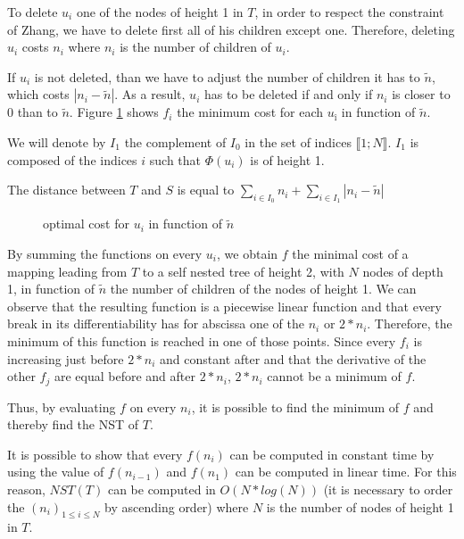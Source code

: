 To delete $u_{i}$ one of the nodes of height 1 in $T$, in order to
respect the constraint of Zhang, we have to delete first all of his
children except one. Therefore, deleting $u_{i}$ costs $n_{i}$ where
$n_{i}$ is the number of children of $u_{i}$.

If $u_{i}$ is not deleted, than we have to adjust the number of
children it has to $\tilde{n}$, which costs
$\left|n_{i} - \tilde{n}\right|$. As a result, $u_{i}$ has to be
deleted if and only if $n_{i}$ is closer to 0 than to
$\tilde{n}$. Figure \ref{fig:optimalcost} shows $f_{i}$ the minimum
cost for each $u_{î}$ in function of $\tilde{n}$.

We will denote by $I_{1}$ the complement of $I_{0}$ in the set of
indices $\llbracket 1;N \rrbracket$. $I_{1}$ is composed of the
indices $i$ such that $\Phi(u_{i})$ is of height 1.
\begin{remark}
  The distance between $T$ and $S$ is equal to $\sum_{i \in I_{0}}
  n_{i} + \sum_{i \in I_{1}} \left| n_{i} - \tilde{n} \right|$
\end{remark}

\begin{figure}
  \centering
  \caption{optimal cost for $u_{i}$ in function of $\tilde{n}$}
  \label{fig:optimalcost}
\end{figure}

By summing the functions on every $u_{i}$, we obtain $f$ the minimal
cost of a mapping leading from $T$ to a self nested tree of height 2,
with $N$ nodes of depth 1, in function of $\tilde{n}$ the number of
children of the nodes of height 1. We can observe that the resulting
function is a piecewise linear function and that every break in its
differentiability has for abscissa one of the $n_{i}$ or
$2*n_{i}$. Therefore, the minimum of this function is reached in one
of those points. Since every $f_{i}$ is increasing just before $2*n_{i}$ and
constant after and that the derivative of the other $f_{j}$ are equal
before and after $2*n_{i}$, $2*n_{i}$ cannot be a minimum of $f$.

Thus, by evaluating $f$ on every $n_{i}$, it is possible to find the
minimum of $f$ and thereby find the NST of $T$.

It is possible to show that every $f(n_{i})$ can be computed in
constant time by using the value of $f(n_{i-1})$ and $f(n_{1})$ can be
computed in linear time. For this reason, $NST(T)$ can be computed in
$O(N*log(N))$ (it is necessary to order the
$(n_{i})_{1 \leqslant i \leqslant N}$ by ascending order) where $N$ is
the number of nodes of height 1 in $T$.

